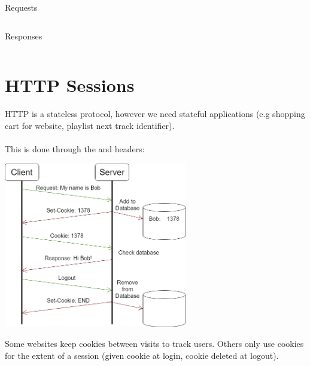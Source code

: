 \begin{examplebox}{Requests}
    \begin{center}
        \begin{minipage}[t]{0.9\textwidth}
            \inputminted{HTML}{the_web/code/do_not_cache_requests}
        \end{minipage}
    \end{center}
\end{examplebox}
\begin{examplebox}{Responses}
    \begin{center}
        \begin{minipage}[t]{0.9\textwidth}
            \inputminted{HTML}{the_web/code/do_not_cache_responses}
        \end{minipage}
    \end{center}
\end{examplebox}

\section{HTTP Sessions}
HTTP is a stateless protocol, however we need stateful applications (e.g shopping cart for website, playlist next track identifier).
\\
\\ This is done through the  and  headers:
\begin{center}\includegraphics[width=0.6\textwidth]{the_web/images/cookies.png}\end{center}
Some websites keep cookies between visits to track users. Others only use cookies for the extent of a session (given cookie at login, cookie deleted at logout).

